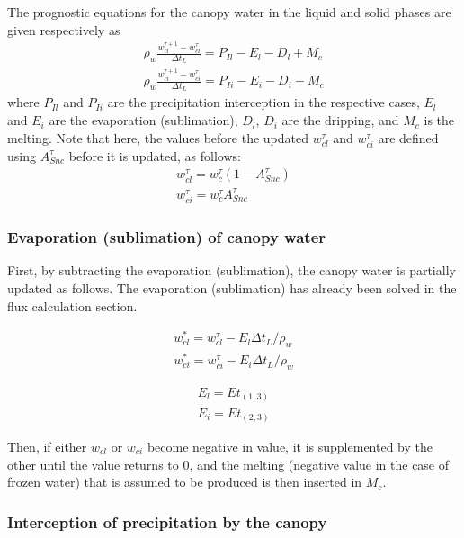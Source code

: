 The prognostic equations for the canopy water in the liquid and solid phases are given respectively as \begin{eqnarray}
 \rho_w \frac{w_{cl}^{\tau+1} - w_{cl}^{\tau}}{\Delta t_L}
  = P_{Il} - E_l - D_l + M_c \\
 \rho_w \frac{w_{ci}^{\tau+1} - w_{ci}^{\tau}}{\Delta t_L}
  = P_{Ii} - E_i - D_i - M_c
\end{eqnarray} where \(P_{Il}\) and \(P_{Ii}\) are the precipitation interception in the respective cases, \(E_l\) and \(E_i\) are the evaporation (sublimation), \(D_l\), \(D_i\) are the dripping, and \(M_c\) is
the melting. Note that here, the values before the updated \(w_{cl}^{\tau}\) and \(w_{ci}^{\tau}\) are defined using \(A_{Snc}^{\tau}\) before it is updated, as follows: \begin{eqnarray}
 w_{cl}^{\tau} = w_c^{\tau} ( 1 - A_{Snc}^{\tau}) \\
 w_{ci}^{\tau} = w_c^{\tau} A_{Snc}^{\tau}
\end{eqnarray}

\hypertarget{evaporation-sublimation-of-canopy-water}{%
\subsubsection{Evaporation (sublimation) of canopy water}\label{evaporation-sublimation-of-canopy-water}}

First, by subtracting the evaporation (sublimation), the canopy water is partially updated as follows. The evaporation (sublimation) has already been solved in the flux calculation section.

\begin{eqnarray}
 w_{cl}^\ast = w_{cl}^{\tau} - E_l \Delta t_L / \rho_w \\
 w_{ci}^\ast = w_{ci}^{\tau} - E_i \Delta t_L / \rho_w
\end{eqnarray}

\begin{eqnarray}
 E_l = Et_{(1,3)} \\
 E_i = Et_{(2,3)}
\end{eqnarray}

Then, if either \(w_{cl}\) or \(w_{ci}\) become negative in value, it is supplemented by the other until the value returns to 0, and the melting (negative value in the case of frozen water) that is
assumed to be produced is then inserted in \(M_c\).

\hypertarget{interception-of-precipitation-by-the-canopy}{%
\subsubsection{Interception of precipitation by the canopy}\label{interception-of-precipitation-by-the-canopy}}

